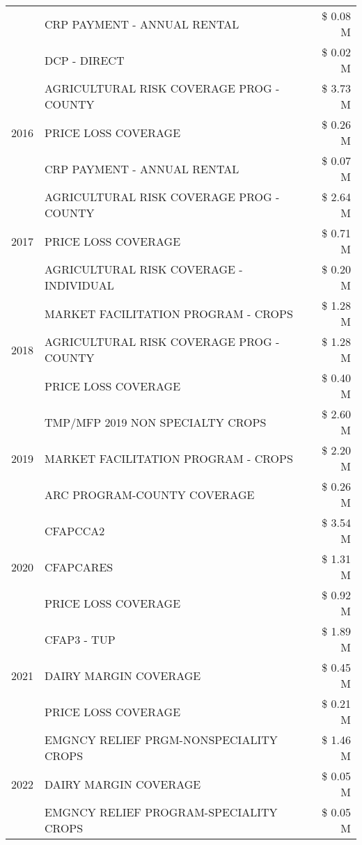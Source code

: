 \begin{tabular}{llr}
 & CRP PAYMENT - ANNUAL RENTAL & \$ 0.08 M \\
 & DCP - DIRECT & \$ 0.02 M \\
\cline{1-3}
\multirow[t]{3}{*}{2016} & AGRICULTURAL RISK COVERAGE PROG - COUNTY & \$ 3.73 M \\
 & PRICE LOSS COVERAGE & \$ 0.26 M \\
 & CRP PAYMENT - ANNUAL RENTAL & \$ 0.07 M \\
\cline{1-3}
\multirow[t]{3}{*}{2017} & AGRICULTURAL RISK COVERAGE PROG - COUNTY & \$ 2.64 M \\
 & PRICE LOSS COVERAGE & \$ 0.71 M \\
 & AGRICULTURAL RISK COVERAGE - INDIVIDUAL & \$ 0.20 M \\
\cline{1-3}
\multirow[t]{3}{*}{2018} & MARKET FACILITATION PROGRAM - CROPS & \$ 1.28 M \\
 & AGRICULTURAL RISK COVERAGE PROG - COUNTY & \$ 1.28 M \\
 & PRICE LOSS COVERAGE & \$ 0.40 M \\
\cline{1-3}
\multirow[t]{3}{*}{2019} & TMP/MFP 2019 NON SPECIALTY CROPS & \$ 2.60 M \\
 & MARKET FACILITATION PROGRAM - CROPS & \$ 2.20 M \\
 & ARC PROGRAM-COUNTY COVERAGE & \$ 0.26 M \\
\cline{1-3}
\multirow[t]{3}{*}{2020} & CFAPCCA2 & \$ 3.54 M \\
 & CFAPCARES & \$ 1.31 M \\
 & PRICE LOSS COVERAGE & \$ 0.92 M \\
\cline{1-3}
\multirow[t]{3}{*}{2021} & CFAP3 - TUP & \$ 1.89 M \\
 & DAIRY MARGIN COVERAGE & \$ 0.45 M \\
 & PRICE LOSS COVERAGE & \$ 0.21 M \\
\cline{1-3}
\multirow[t]{3}{*}{2022} & EMGNCY RELIEF PRGM-NONSPECIALITY CROPS & \$ 1.46 M \\
 & DAIRY MARGIN COVERAGE & \$ 0.05 M \\
 & EMGNCY RELIEF PROGRAM-SPECIALITY CROPS & \$ 0.05 M \\
\cline{1-3}
\bottomrule
\end{tabular}
